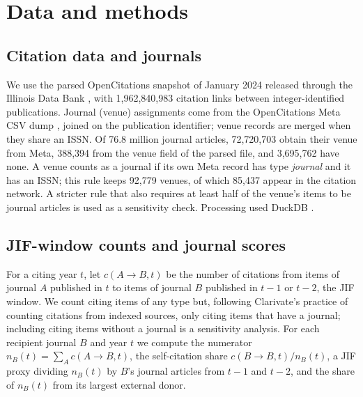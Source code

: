 \section{Data and methods}\label{sec:methods}

\subsection{Citation data and journals}
We use the parsed OpenCitations snapshot of January 2024 released through the Illinois Data Bank
\citep{arjomandi2024dataset}, with 1,962,840,983 citation links between integer-identified publications. Journal
(venue) assignments come from the OpenCitations Meta CSV dump \citep{ocmeta2024dump,massari2024meta}, joined on the
publication identifier; venue records are merged when they share an ISSN. Of 76.8 million journal articles,
72,720,703 obtain their venue from Meta, 388,394 from the venue field of the parsed file, and 3,695,762 have none. A
venue counts as a journal if its own Meta record has type \emph{journal} and it has an ISSN; this rule keeps 92,779
venues, of which 85,437 appear in the citation network. A stricter rule that also requires at least half of the
venue's items to be journal articles is used as a sensitivity check. Processing used DuckDB \citep{raasveldt2019duckdb}.

\subsection{JIF-window counts and journal scores}
For a citing year $t$, let $c(A\!\to\!B,t)$ be the number of citations from items of journal $A$ published in $t$ to
items of journal $B$ published in $t-1$ or $t-2$, the JIF window. We count citing items of any type but, following
Clarivate's practice of counting citations from indexed sources, only citing items that have a journal; including
citing items without a journal is a sensitivity analysis. For each recipient journal $B$ and year $t$ we compute the
numerator $n_B(t)=\sum_A c(A\!\to\!B,t)$, the self-citation share $c(B\!\to\!B,t)/n_B(t)$, a JIF proxy dividing $n_B(t)$
by $B$'s journal articles from $t-1$ and $t-2$, and the share of $n_B(t)$ from its largest external donor.


